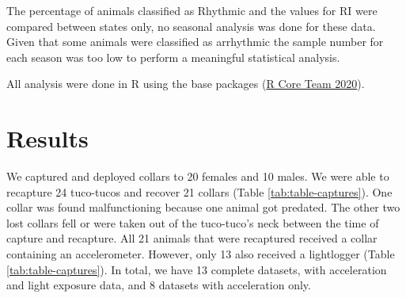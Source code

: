 \documentclass[english,msc,numbers,hidelinks]{coppe}
\begin{document}
  The percentage of animals classified as Rhythmic and the values for RI were compared between states only, no seasonal analysis was done for these data. Given that some animals were classified as arrhythmic the sample number for each season was too low to perform a meaningful statistical analysis.

  All analysis were done in R using the base packages (\protect\hyperlink{ref-rcoreteam2020}{R Core Team 2020}).

  \newpage

  \hypertarget{results}{%
  \section{Results}\label{results}}

  We captured and deployed collars to 20 females and 10 males. We were able to recapture 24 tuco-tucos and recover 21 collars (Table \ref{tab:table-captures}). One collar was found malfunctioning because one animal got predated. The other two lost collars fell or were taken out of the tuco-tuco's neck between the time of capture and recapture. All 21 animals that were recaptured received a collar containing an accelerometer. However, only 13 also received a lightlogger (Table \ref{tab:table-captures}). In total, we have 13 complete datasets, with acceleration and light exposure data, and 8 datasets with acceleration only.
\end{document}
